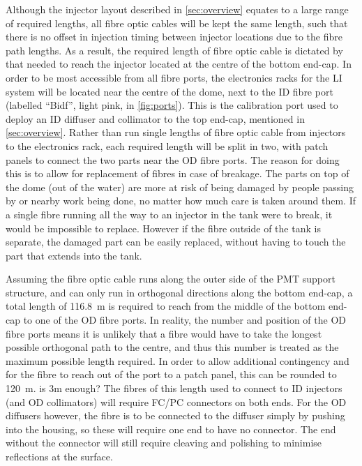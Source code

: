 \documentclass[a4paper,11pt]{article}
\begin{document}
Although the injector layout described in \cref{sec:overview} equates to a large range of required lengths, all fibre optic cables will be kept the same length, such that there is no offset in injection timing between injector locations due to the fibre path lengths. As a result, the required length of fibre optic cable is dictated by that needed to reach the injector located at the centre of the bottom end-cap. In order to be most accessible from all fibre ports, the electronics racks for the LI system will be located near the centre of the dome, next to the ID fibre port (labelled ``Bidf'', light pink, in \cref{fig:ports}). This is the calibration port used to deploy an ID diffuser and collimator to the top end-cap, mentioned in \cref{sec:overview}. Rather than run single lengths of fibre optic cable from injectors to the electronics rack, each required length will be split in two, with patch panels to connect the two parts near the OD fibre ports. The reason for doing this is to allow for replacement of fibres in case of breakage. The parts on top of the dome (out of the water) are more at risk of being damaged by people passing by or nearby work being done, no matter how much care is taken around them. If a single fibre running all the way to an injector in the tank were to break, it would be impossible to replace. However if the fibre outside of the tank is separate, the damaged part can be easily replaced, without having to touch the part that extends into the tank.

Assuming the fibre optic cable runs along the outer side of the PMT support structure, and can only run in orthogonal directions along the bottom end-cap, a total length of 116.8~m is required to reach from the middle of the bottom end-cap to one of the OD fibre ports. In reality, the number and position of the OD fibre ports means it is unlikely that a fibre would have to take the longest possible orthogonal path to the centre, and thus this number is treated as the maximum possible length required. In order to allow additional contingency and for the fibre to reach out of the port to a patch panel, this can be rounded to 120~m. {\color{red} is 3m enough?} The fibres of this length used to connect to ID injectors (and OD collimators) will require FC/PC connectors on both ends. For the OD diffusers however, the fibre is to be connected to the diffuser simply by pushing into the housing, so these will require one end to have no connector. The end without the connector will still require cleaving and polishing to minimise reflections at the surface.
\end{document}
